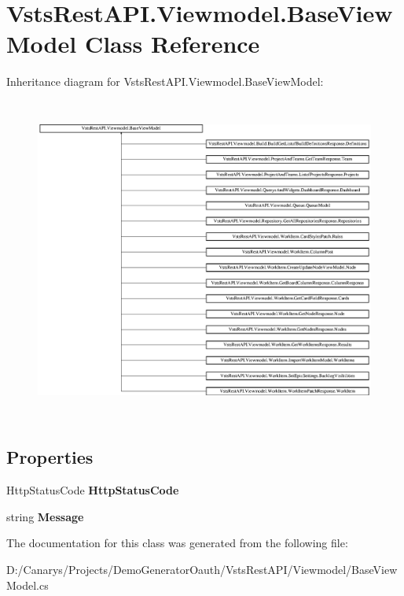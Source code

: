 \hypertarget{class_vsts_rest_a_p_i_1_1_viewmodel_1_1_base_view_model}{}\section{Vsts\+Rest\+A\+P\+I.\+Viewmodel.\+Base\+View\+Model Class Reference}
\label{class_vsts_rest_a_p_i_1_1_viewmodel_1_1_base_view_model}
Inheritance diagram for Vsts\+Rest\+A\+P\+I.\+Viewmodel.\+Base\+View\+Model\+:\begin{figure}[H]
\begin{center}
\leavevmode
\includegraphics[height=10.700637cm]{class_vsts_rest_a_p_i_1_1_viewmodel_1_1_base_view_model}
\end{center}
\end{figure}
\subsection*{Properties}
\begin{DoxyCompactItemize}
\item 
\mbox{\label{class_vsts_rest_a_p_i_1_1_viewmodel_1_1_base_view_model_ac836c52d1e4aa236141f001c78cdc418}} 
Http\+Status\+Code {\bfseries Http\+Status\+Code}
\item 
\mbox{\label{class_vsts_rest_a_p_i_1_1_viewmodel_1_1_base_view_model_a398b7712f9fa75337a9e46d26406de8d}} 
string {\bfseries Message}
\end{DoxyCompactItemize}


The documentation for this class was generated from the following file\+:\begin{DoxyCompactItemize}
\item 
D\+:/\+Canarys/\+Projects/\+Demo\+Generator\+Oauth/\+Vsts\+Rest\+A\+P\+I/\+Viewmodel/Base\+View\+Model.\+cs\end{DoxyCompactItemize}
